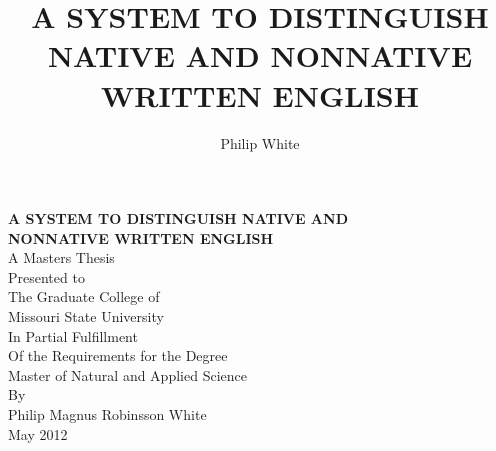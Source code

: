 \documentclass[12pt]{article}
\title{\textbf{A SYSTEM TO DISTINGUISH NATIVE AND NONNATIVE WRITTEN ENGLISH}}
\author{Philip White}
\def\biblio{}
\let\stdsection\section
\renewcommand\section{\clearpage\stdsection}
\begin{document}
\def\biblio{} %

{}
\begin{titlepage}

\centering

\textbf{A SYSTEM TO DISTINGUISH NATIVE AND\\NONNATIVE WRITTEN ENGLISH}\\

\null\null
A Masters Thesis\\
Presented to\\
The Graduate College of\\
Missouri State University\\
\null\null\null\null
In Partial Fulfillment\\
Of the Requirements for the Degree\\
Master of Natural and Applied Science\\
\null\null\null\null
By\\
Philip Magnus Robinsson White\\
May 2012

\end{titlepage}
\setcounter{page}{2}

\newpage


\begingroup
\setlength{\cftbeforesecskip}{12pt}
\setlength{\cftbeforesubsecskip}{0pt}
\setlength{\cftbeforefigskip}{12pt}
\setlength{\cftbeforetabskip}{12pt}
\singlespacing
\tableofcontents\newpage
\listoftables\newpage
\listoffigures
\endgroup

\setlength{\intextsep}{24pt}
\setlength{\floatsep}{48pt} %



\doublespacing
\newpage
{}
\setcounter{page}{1}
\setcounter{secnumdepth}{-1}

\titleformat{\section}{\normalfont\bfseries\centering}{}{}{\MakeUppercase}
\titleformat{\subsection}{\normalfont\bfseries}{}{}{}
\titlespacing{\section}{0pt}{0pt}{24pt}
\titlespacing*{\subsection}{0pt}{24pt}{0pt}
\end{document}
